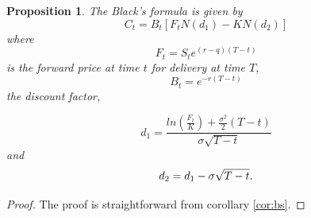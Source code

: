 \documentclass{article}
\newtheorem{prop}[thm]{Proposition}
\theoremstyle{definition}
\theoremstyle{remark}
\begin{document}
\begin{prop}
The \emph{Black's formula} is given by
\begin{equation}\label{eq:black} %
C_t=B_t[F_tN(d_1)-KN(d_2)]
\end{equation}
where 
\begin{equation}
F_t=S_te^{(r-q)(T-t)}
\end{equation}
is the \emph{forward price} at time $t$ for delivery at time $T$,
\begin{equation}
B_t=e^{-r(T-t)}
\end{equation} 
the \emph{discount factor},

\begin{equation}
d_1%
=\frac{ln\left( \frac{F_t}{K}\right)+ \frac{\sigma^2}{2}(T-t)}{\sigma\sqrt{T-t}}
\end{equation}
and
\begin{equation}
d_2=d_1-\sigma\sqrt{T-t}.\\
\end{equation}
\end{prop}

\begin{proof}
The proof is straightforward from corollary \ref{cor:bs}. 

\end{proof}










\newpage
\end{document}
